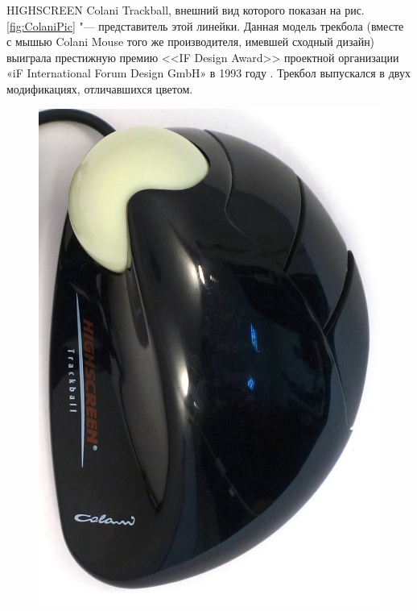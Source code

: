 \documentclass[11pt, a4paper]{article}
\begin{document}
HIGHSCREEN Colani Trackball, внешний вид которого показан на рис. \ref{fig:ColaniPic} "--- представитель этой линейки. Данная модель трекбола (вместе с мышью Colani Mouse того же производителя, имевшей сходный дизайн) выиграла престижную премию <<IF Design Award>> проектной организации «iF International Forum Design GmbH» в 1993 году \cite{award}. Трекбол выпускался в двух модификациях, отличавшихся цветом.

\begin{figure}[h]
    \centering
    \includegraphics[scale=0.5]{1993_colani_trackball/top_b_30.jpg}

\end{figure}
\end{document}
